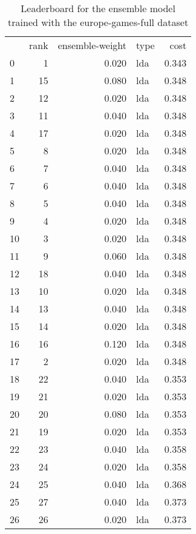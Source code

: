 \begin{table}[]
	\centering
	\begin{tabular}{lrrlr}
		   & rank & ensemble-weight & type & cost  \\
		0  & 1    & 0.020           & lda  & 0.343 \\
		1  & 15   & 0.080           & lda  & 0.348 \\
		2  & 12   & 0.020           & lda  & 0.348 \\
		3  & 11   & 0.040           & lda  & 0.348 \\
		4  & 17   & 0.020           & lda  & 0.348 \\
		5  & 8    & 0.020           & lda  & 0.348 \\
		6  & 7    & 0.040           & lda  & 0.348 \\
		7  & 6    & 0.040           & lda  & 0.348 \\
		8  & 5    & 0.040           & lda  & 0.348 \\
		9  & 4    & 0.020           & lda  & 0.348 \\
		10 & 3    & 0.020           & lda  & 0.348 \\
		11 & 9    & 0.060           & lda  & 0.348 \\
		12 & 18   & 0.040           & lda  & 0.348 \\
		13 & 10   & 0.020           & lda  & 0.348 \\
		14 & 13   & 0.040           & lda  & 0.348 \\
		15 & 14   & 0.020           & lda  & 0.348 \\
		16 & 16   & 0.120           & lda  & 0.348 \\
		17 & 2    & 0.020           & lda  & 0.348 \\
		18 & 22   & 0.040           & lda  & 0.353 \\
		19 & 21   & 0.020           & lda  & 0.353 \\
		20 & 20   & 0.080           & lda  & 0.353 \\
		21 & 19   & 0.020           & lda  & 0.353 \\
		22 & 23   & 0.040           & lda  & 0.358 \\
		23 & 24   & 0.020           & lda  & 0.358 \\
		24 & 25   & 0.040           & lda  & 0.368 \\
		25 & 27   & 0.040           & lda  & 0.373 \\
		26 & 26   & 0.020           & lda  & 0.373 \\
	\end{tabular}

	\caption{Leaderboard for the ensemble model trained with the europe-games-full dataset}
	\label{tab:lb-europe-games-full}
\end{table}

